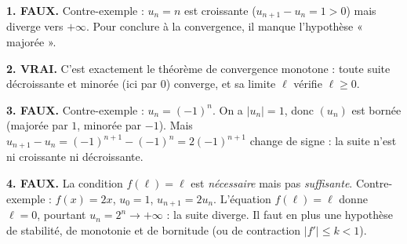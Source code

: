 \documentclass[11pt]{article}
\begin{document}
\begin{corrige}
\textbf{1. FAUX.} Contre-exemple : $u_n = n$ est croissante ($u_{n+1} - u_n = 1 > 0$) mais diverge vers $+\infty$. Pour conclure à la convergence, il manque l'hypothèse « majorée ».

\textbf{2. VRAI.} C'est exactement le théorème de convergence monotone : toute suite décroissante et minorée (ici par $0$) converge, et sa limite $\ell$ vérifie $\ell \geq 0$.

\textbf{3. FAUX.} Contre-exemple : $u_n = (-1)^n$. On a $|u_n| = 1$, donc $(u_n)$ est bornée (majorée par $1$, minorée par $-1$). Mais $u_{n+1} - u_n = (-1)^{n+1} - (-1)^n = 2(-1)^{n+1}$ change de signe : la suite n'est ni croissante ni décroissante.

\textbf{4. FAUX.} La condition $f(\ell) = \ell$ est \emph{nécessaire} mais pas \emph{suffisante}. Contre-exemple : $f(x) = 2x$, $u_0 = 1$, $u_{n+1} = 2u_n$. L'équation $f(\ell) = \ell$ donne $\ell = 0$, pourtant $u_n = 2^n \to +\infty$ : la suite diverge. Il faut en plus une hypothèse de stabilité, de monotonie et de bornitude (ou de contraction $|f'| \leq k < 1$).
\end{corrige}
\end{document}

